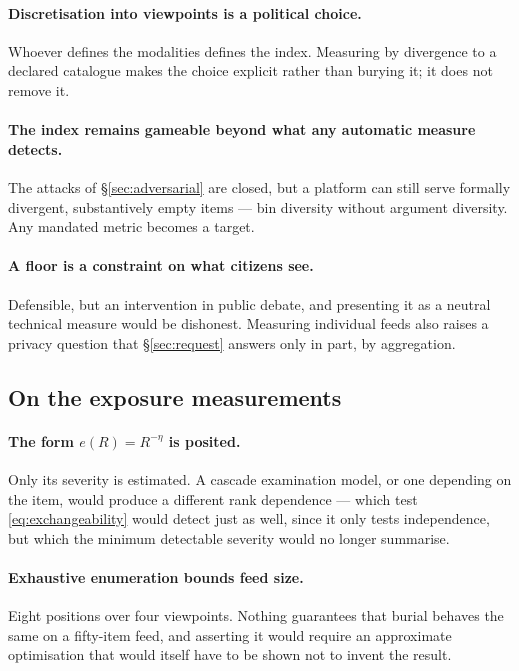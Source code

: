 \documentclass[11pt,a4paper]{article}
\begin{document}
\paragraph{Discretisation into viewpoints is a political choice.} Whoever defines the modalities
defines the index. Measuring by divergence to a declared catalogue makes the choice explicit
rather than burying it; it does not remove it.

\paragraph{The index remains gameable beyond what any automatic measure detects.} The attacks of
\S\ref{sec:adversarial} are closed, but a platform can still serve formally divergent,
substantively empty items --- bin diversity without argument diversity. Any mandated metric
becomes a target.

\paragraph{A floor is a constraint on what citizens see.} Defensible, but an intervention in
public debate, and presenting it as a neutral technical measure would be dishonest. Measuring
individual feeds also raises a privacy question that \S\ref{sec:request} answers only in part,
by aggregation.

\subsection{On the exposure measurements}

\paragraph{The form $e(R) = R^{-\eta}$ is posited.} Only its severity is estimated. A cascade
examination model, or one depending on the item, would produce a different rank dependence ---
which test \eqref{eq:exchangeability} would detect just as well, since it only tests
independence, but which the minimum detectable severity would no longer summarise.

\paragraph{Exhaustive enumeration bounds feed size.} Eight positions over four viewpoints.
Nothing guarantees that burial behaves the same on a fifty-item feed, and asserting it would
require an approximate optimisation that would itself have to be shown not to invent the result.
\end{document}
